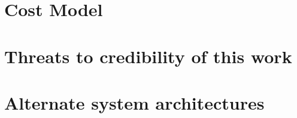 \section{Cost Model}\label{sec:costModel}
\section{Threats to credibility of this work}\label{sec:threats}
\section{Alternate system architectures}\label{sec:altArchitectures}
